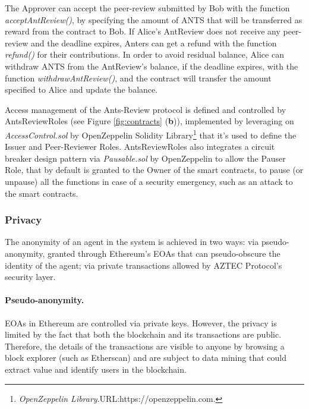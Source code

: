 \documentclass[runningheads]{llncs}
\begin{document}
The Approver can accept the peer-review submitted by Bob with the function \emph{acceptAntReview()}, by specifying the amount of ANTS that will be transferred as reward from the contract to Bob.
If Alice's AntReview does not receive any peer-review and the deadline expires, Anters can get a refund with the function \emph{refund()} for their contributions. In order to avoid residual balance, Alice can withdraw ANTS from the AntReview's balance, if the deadline expires, with the function \emph{withdrawAntReview()}, and the contract will transfer the amount specified to Alice and update the balance.

Access management of the Ants-Review protocol is defined and controlled by AntsReviewRoles (see Figure \ref{fig:contracts} (\textbf{b})), implemented by leveraging on \emph{AccessControl.sol} by OpenZeppelin Solidity Library\footnote[10]{\emph{OpenZeppelin Library}.\textsc{URL:}https://openzeppelin.com.} that it's used to define the Issuer and Peer-Reviewer Roles.
\newline AntsReviewRoles also integrates a circuit breaker design pattern via \emph{Pausable.sol} by OpenZeppelin to allow the Pauser Role, that by default is granted to the Owner of the smart contracts, to pause (or unpause) all the functions in case of a security emergency, such as an attack to the smart contracts.

\subsubsection{Privacy}
The anonymity of an agent in the system is achieved in two ways: via pseudo-anonymity, granted through Ethereum's EOAs that can pseudo-obscure the identity of the agent; via private transactions allowed by AZTEC Protocol\cite{AZTEC}'s security layer.

\paragraph{Pseudo-anonymity.}EOAs in Ethereum are controlled via private keys. However, the privacy is limited by the fact that both the blockchain and its transactions are public.  Therefore, the details of the transactions are visible to anyone by browsing a block explorer (such as Etherscan) and are subject to data mining that could extract value and identify users in the blockchain.
\end{document}
